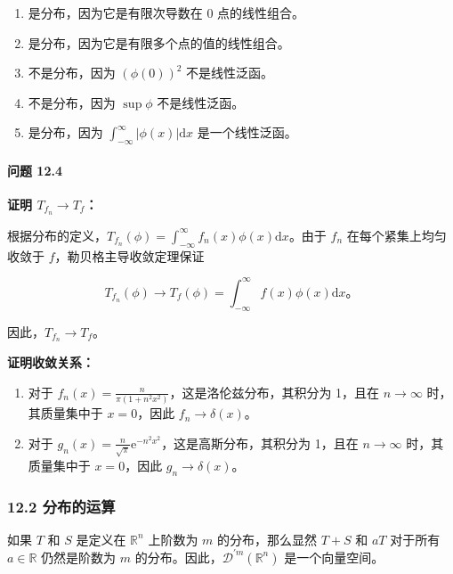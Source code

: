 \begin{enumerate}
\def\labelenumi{(\alph{enumi})}
\item
  是分布，因为它是有限次导数在 0 点的线性组合。
\item
  是分布，因为它是有限多个点的值的线性组合。
\item
  不是分布，因为 \((\phi(0))^2\) 不是线性泛函。
\item
  不是分布，因为 \(\sup \phi\) 不是线性泛函。
\item
  是分布，因为 \(\int_{-\infty}^\infty |\phi(x)| \mathrm{d}x\)
  是一个线性泛函。
\end{enumerate}

\paragraph{问题 12.4}\label{ux95eeux9898-12.4}

\textbf{证明 \(T_{f_n} \to T_f\)：}

根据分布的定义，\(T_{f_n}(\phi) = \int_{-\infty}^\infty f_n(x) \phi(x) \mathrm{d}x\)。由于
\(f_n\) 在每个紧集上均匀收敛于 \(f\)，勒贝格主导收敛定理保证

\[
T_{f_n}(\phi) \to T_f(\phi) = \int_{-\infty}^\infty f(x) \phi(x) \mathrm{d}x。
\]

因此，\(T_{f_n} \to T_f\)。

\textbf{证明收敛关系：}

\begin{enumerate}
\def\labelenumi{\arabic{enumi}.}
\item
  对于 \(f_n(x) = \frac{n}{\pi(1 + n^2 x^2)}\)，这是洛伦兹分布，其积分为
  1，且在 \(n \to \infty\) 时，其质量集中于 \(x = 0\)，因此
  \(f_n \to \delta(x)\)。
\item
  对于
  \(g_n(x) = \frac{n}{\sqrt{\pi}} \mathrm{e}^{-n^2 x^2}\)，这是高斯分布，其积分为
  1，且在 \(n \to \infty\) 时，其质量集中于 \(x = 0\)，因此
  \(g_n \to \delta(x)\)。
\end{enumerate}

\subsubsection{12.2 分布的运算}\label{ux5206ux5e03ux7684ux8fd0ux7b97}

如果 \(T\) 和 \(S\) 是定义在 \(\mathbb{R}^n\) 上阶数为 \(m\)
的分布，那么显然 \(T + S\) 和 \(a T\) 对于所有 \(a \in \mathbb{R}\)
仍然是阶数为 \(m\)
的分布。因此，\(\mathcal{D}^{\prime m}(\mathbb{R}^n)\) 是一个向量空间。

